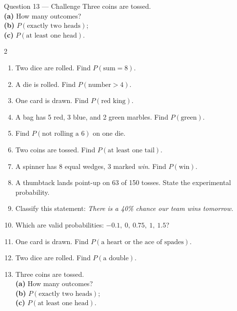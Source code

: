 \documentclass[11pt]{article}
\begin{document}
\begin{qbox}{Question 13 --- Challenge}
Three coins are tossed. \\ \textbf{(a)} How many outcomes? \\ \textbf{(b)} $P(\text{exactly two heads})$; \\ \textbf{(c)} $P(\text{at least one head})$.\workspace{3cm}
\end{qbox}

\clearpage
{}

\begin{recapbox}
\begin{multicols}{2}
\small
\begin{enumerate}[leftmargin=*,itemsep=3pt]
  \item Two dice are rolled. Find $P(\text{sum}=8)$.
  \item A die is rolled. Find $P(\text{number}>4)$.
  \item One card is drawn. Find $P(\text{red king})$.
  \item A bag has 5 red, 3 blue, and 2 green marbles. Find $P(\text{green})$.
  \item Find $P(\text{not rolling a 6})$ on one die.
  \item Two coins are tossed. Find $P(\text{at least one tail})$.
  \item A spinner has 8 equal wedges, 3 marked \emph{win}. Find $P(\text{win})$.
  \item A thumbtack lands point-up on 63 of 150 tosses. State the experimental probability.
  \item Classify this statement: \emph{There is a 40\% chance our team wins tomorrow.}
  \item Which are valid probabilities: $-0.1,\ 0,\ 0.75,\ 1,\ 1.5$?
  \item One card is drawn. Find $P(\text{a heart or the ace of spades})$.
  \item Two dice are rolled. Find $P(\text{a double})$.
  \item Three coins are tossed. \\ \textbf{(a)} How many outcomes? \\ \textbf{(b)} $P(\text{exactly two heads})$; \\ \textbf{(c)} $P(\text{at least one head})$.
\end{enumerate}
\end{multicols}
\end{recapbox}
\end{document}
